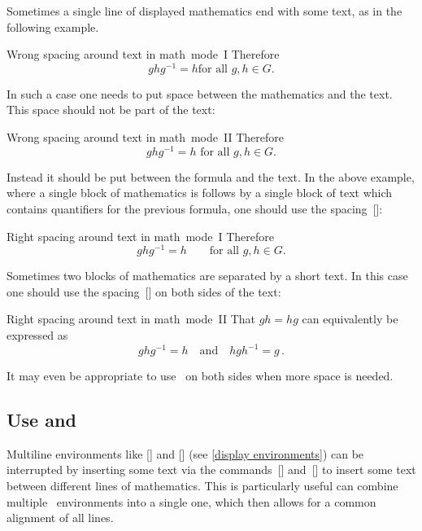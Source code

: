 Sometimes a single line of displayed mathematics end with some text, as in the following example.
\begin{showlatex}{Wrong spacing around text in math~mode~I}
Therefore
\[
  g h g^{-1}
  =
  h
  \text{for all $g, h \in G$}.
\]
\end{showlatex}
In such a case one needs to put space between the mathematics and the text.
This space should not be part of the text:
\begin{showlatex}{Wrong spacing around text in math~mode~II}
Therefore
\[
  g h g^{-1}
  =
  h
  \text{ for all $g, h \in G$.}
\]
\end{showlatex}
Instead it should be put between the formula and the text.
In the above example, where a single block of mathematics is follows by a single block of text which contains quantifiers for the previous formula, one should use the spacing~[\comname]:
\begin{showlatex}{Right spacing around text in math~mode~I}
Therefore
\[
  g h g^{-1}
  =
  h
  \qquad
  \text{for all $g, h \in G$.}
\]
\end{showlatex}
Sometimes two blocks of mathematics are separated by a short text.
In this case one should use the spacing~[\comname] on both sides of the text:
\begin{showlatex}{Right spacing around text in math~mode~II}
That $gh = hg$ can equivalently be expressed as
\[
  g h g^{-1} = h
  \quad\text{and}\quad
  h g h^{-1} = g \,.
\]
\end{showlatex}
It may even be appropriate to use~ on both sides when more space is needed.



\subsection{Use  and }

Multiline environments like [\envname] and [\envname] (see \cref{display environments}) can be interrupted by inserting some text via the commands~[\comname] and~[\comname] to insert some text between different lines of mathematics.
This is particularly useful can combine multiple ~environments into a single one, which then allows for a common alignment of all lines.

